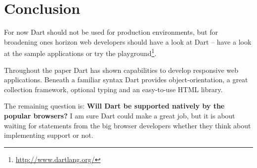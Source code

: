 \section{Conclusion}

For now Dart should not be used for production environments, but for broadening ones horizon web developers should have a look at Dart -- have a look at the sample applications or try the playground\footnote{\url{http://www.dartlang.org/}}.

Throughout the paper Dart has shown capabilities to develop responsive web applications. Beneath a familiar syntax Dart provides object-orientation, a great collection framework, optional typing and an easy-to-use HTML library.

The remaining question is: \textbf{Will Dart be supported natively by the popular browsers?} I am sure Dart could make a great job, but it is about waiting for statements from the big browser developers whether they think about implementing support or not.